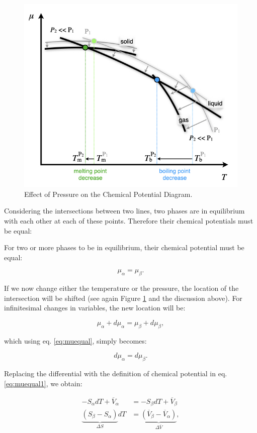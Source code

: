 \documentclass[
  9pt,
]{extbook}
\theoremstyle{definition}
\theoremstyle{definition}
\theoremstyle{definition}
\theoremstyle{remark}
\begin{document}
\begin{figure}

{\centering \includegraphics[width=0.6\linewidth]{./img/OEP_Figures.017} 

}

\caption{Effect of Pressure on the Chemical Potential Diagram.}\label{fig:FigPhase2}
\end{figure}

Considering the intersections between two lines, two phases are in equilibrium with each other at each of these points. Therefore their chemical potentials must be equal:

For two or more phases to be in equilibrium, their chemical potential must be equal:

\begin{equation}
\mu_{\alpha} = \mu_{\beta}.
\label{eq:muequal}
\end{equation}

If we now change either the temperature or the pressure, the location of the intersection will be shifted (see again Figure \ref{fig:FigPhase2} and the discussion above). For infinitesimal changes in variables, the new location will be:

\begin{equation}
\mu_{\alpha} + d\mu_{\alpha}= \mu_{\beta}+d\mu_{\beta},
\label{eq:muequalA}
\end{equation}

which using eq. \eqref{eq:muequal}, simply becomes:

\begin{equation}
d\mu_{\alpha}= d\mu_{\beta}.
\label{eq:muequalB}
\end{equation}

Replacing the differential with the definition of chemical potential in eq. \eqref{eq:muequal1}, we obtain:

\begin{equation}
\begin{aligned}
-S_{\alpha}dT+\overline{V}_{\alpha} &= -S_{\beta}dT+\overline{V}_{\beta} \\
\underbrace{\left(S_{\beta}-S_{\alpha}\right)}_{\Delta S} dT &= \underbrace{\left( \overline{V}_{\beta}-\overline{V}_{\alpha}\right)}_{\Delta \overline{V}},
\end{aligned}
\label{eq:muequalC}
\end{equation}
\end{document}
